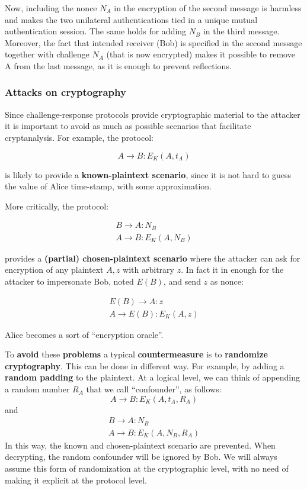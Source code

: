 Now, including the nonce $N_A$ in the encryption of the second message is harmless and makes the two unilateral authentications tied in a unique mutual authentication session. The same holds for adding $N_B$ in the third message. Moreover, the fact that intended receiver (Bob) is specified in the second message together with challenge $N_A$ (that is now encrypted) makes it possible to remove A from the last message, as it is enough to prevent reflections.

\subsubsection{Attacks on cryptography}
Since challenge-response protocols provide cryptographic material to the attacker it is important to avoid as much as possible scenarios that facilitate cryptanalysis. For example, the protocol:

$$A \rightarrow B: E_K(A, t_A) $$

is likely to provide a \textbf{known-plaintext scenario}, since it is not hard to guess the value of Alice time-stamp, with some approximation. 

More critically, the protocol:

$$\begin{array}{l} B \rightarrow A: N_B\\A \rightarrow B: E_K(A, N_B) \end{array}$$

provides a \textbf{(partial) chosen-plaintext scenario} where the attacker can ask for encryption of any plaintext $A,z$ with arbitrary $z$. In fact it in enough for the attacker to impersonate Bob, noted $E(B)$, and send $z$ as nonce:

$$\begin{array}{l} E(B) \rightarrow A: z\\A \rightarrow E(B): E_K(A, z) \end{array}$$

Alice becomes a sort of “encryption oracle”.

To \textbf{avoid} these \textbf{problems} a typical \textbf{countermeasure} is to \textbf{randomize cryptography}. This can be done in different way. For example, by adding a \textbf{random padding} to the plaintext. At a logical level, we can think of appending a random number $R_A$ that we call “confounder”, as follows:
$$A \rightarrow B: E_K(A, t_A,R_A) $$
and
$$\begin{array}{l} B \rightarrow A: N_B\\A \rightarrow B: E_K(A, N_B, R_A) \end{array}$$
In this way, the known and chosen-plaintext scenario are prevented. When decrypting, the random confounder will be ignored by Bob. We will always assume this form of randomization at the cryptographic level, with no need of making it explicit at the protocol level.

